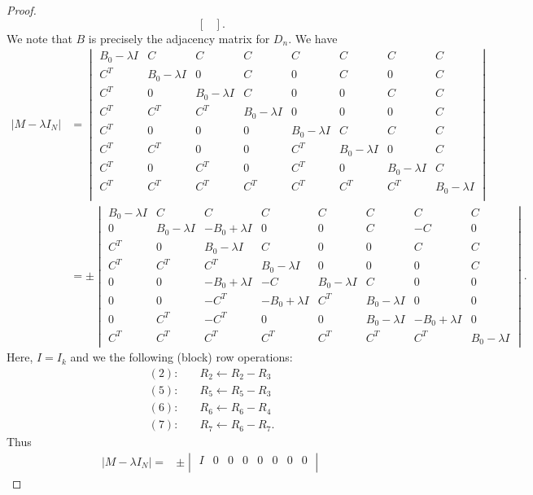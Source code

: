 \documentclass[11pt,a4paper]{amsart}
\theoremstyle{definition}
\numberwithin{equation}{section}
\begin{document}
\begin{proof}
\[\begin{bmatrix}
\end{bmatrix}.
\]
We note that $B$ is precisely the adjacency matrix for $D_n$. We have
\[
\begin{aligned}
| M - \lambda I_N| &= \begin{vmatrix}
B_0-\lambda I & C & C & C & C & C & C & C \\
C^T & B_0-\lambda I & 0 & C & 0 & C & 0 & C \\
C^T & 0 & B_0-\lambda I & C & 0 & 0 & C & C \\
C^T & C^T & C^T & B_0-\lambda I & 0 & 0 & 0 & C \\
C^T & 0 & 0 & 0 & B_0-\lambda I & C & C & C \\
C^T & C^T & 0 & 0 & C^T & B_0-\lambda I & 0 & C \\
C^T & 0 & C^T & 0 & C^T & 0 & B_0-\lambda I & C \\
C^T & C^T & C^T & C^T & C^T & C^T & C^T & B_0-\lambda I \\
\end{vmatrix}\\
&=
\pm\begin{vmatrix}
B_0 - \lambda I & C & C & C & C & C & C & C \\
0 & B_0 - \lambda I & -B_0 + \lambda I & 0 & 0 & C & -C & 0 \\
C^T & 0 & B_0 - \lambda I & C & 0 & 0 & C & C \\
C^T & C^T & C^T & B_0 - \lambda I & 0 & 0 & 0 & C \\
0 & 0 & -B_0 + \lambda I & -C & B_0 - \lambda I & C & 0 & 0 \\
0 & 0 & -C^T & -B_0 + \lambda I & C^T & B_0 - \lambda I & 0 & 0 \\
0 & C^T & -C^T & 0 & 0 & B_0 - \lambda I & -B_0 + \lambda I & 0 \\
C^T & C^T & C^T & C^T & C^T & C^T & C^T & B_0 - \lambda I
\end{vmatrix}.
\end{aligned}
\]
Here, $I=I_k$ and we the following (block) row operations:
\begin{align*}
(2):\quad & R_2 \leftarrow R_2 - R_3 \\
(5):\quad & R_5 \leftarrow R_5 - R_3  \\
(6):\quad & R_6 \leftarrow R_6 - R_4 \\
(7):\quad & R_7 \leftarrow R_6 - R_7.
\end{align*}
Thus
\[
\begin{aligned}
| M - \lambda I_N |   =
&\pm 
\begin{vmatrix}
I & 0 & 0 & 0 & 0 & 0 & 0 & 0 \\

\end{vmatrix}
\end{aligned}\]
\end{proof}
\end{document}
